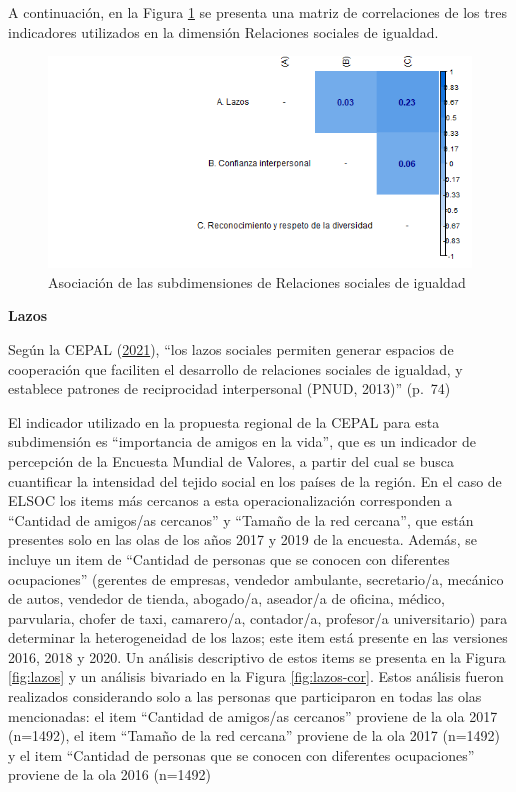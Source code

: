 \documentclass[
  12pt,
]{book}
\begin{document}
A continuación, en la Figura \ref{fig:relaciones-igualdad} se presenta una matriz de correlaciones de los tres indicadores utilizados en la dimensión Relaciones sociales de igualdad.

\begin{figure}[H]

{\centering \includegraphics[width=1\linewidth,height=1\textheight]{output/graphs/relaciones_cor} 

}

\caption{Asociación de las subdimensiones de Relaciones sociales de igualdad}\label{fig:relaciones-igualdad}
\end{figure}

\textbf{Lazos}

Según la CEPAL (\protect\hyperlink{ref-cepal_cohesion_2021}{2021}), ``los lazos sociales permiten generar espacios de cooperación que faciliten el desarrollo de relaciones sociales de igualdad, y establece patrones de reciprocidad interpersonal (PNUD, 2013)'' (p.~74)

El indicador utilizado en la propuesta regional de la CEPAL para esta subdimensión es ``importancia de amigos en la vida'', que es un indicador de percepción de la Encuesta Mundial de Valores, a partir del cual se busca cuantificar la intensidad del tejido social en los países de la región. En el caso de ELSOC los items más cercanos a esta operacionalización corresponden a ``Cantidad de amigos/as cercanos'' y ``Tamaño de la red cercana'', que están presentes solo en las olas de los años 2017 y 2019 de la encuesta. Además, se incluye un item de ``Cantidad de personas que se conocen con diferentes ocupaciones'' (gerentes de empresas, vendedor ambulante, secretario/a, mecánico de autos, vendedor de tienda, abogado/a, aseador/a de oficina, médico, parvularia, chofer de taxi, camarero/a, contador/a, profesor/a universitario) para determinar la heterogeneidad de los lazos; este item está presente en las versiones 2016, 2018 y 2020. Un análisis descriptivo de estos items se presenta en la Figura \ref{fig:lazos} y un análisis bivariado en la Figura \ref{fig:lazos-cor}. Estos análisis fueron realizados considerando solo a las personas que participaron en todas las olas mencionadas: el item ``Cantidad de amigos/as cercanos'' proviene de la ola 2017 (n=1492), el item ``Tamaño de la red cercana'' proviene de la ola 2017 (n=1492) y el item ``Cantidad de personas que se conocen con diferentes ocupaciones'' proviene de la ola 2016 (n=1492)
\end{document}

